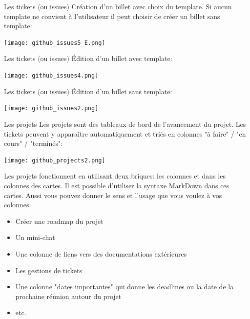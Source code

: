 \documentclass{beamer}
\begin{document}
\begin{frame}{Les tickets (ou issues)}
Création d'un billet avec choix du template. Si aucun template ne convient à l'utilisateur il peut choisir de créer un billet sans template:
\begin{center}
	\texttt{[image: github\_issues5\_E.png]}
\end{center}
\end{frame}

\begin{frame}{Les tickets (ou issues)}
Édition d'un billet avec template:
\begin{center}
	\texttt{[image: github\_issues4.png]}
\end{center}
\end{frame}

\begin{frame}{Les tickets (ou issues)}
Édition d'un billet sans template:
\begin{center}
	\texttt{[image: github\_issues2.png]}
\end{center}
\end{frame}


\begin{frame}{Les projets}
Les projets sont des tableaux de bord de l'avancement du projet. Les tickets peuvent y apparaître automatiquement et triés en colonnes "à faire" / "en cours" / "terminés":
\begin{center}
	\texttt{[image: github\_projects2.png]}
\end{center}
\end{frame}

\begin{frame}
Les projets fonctionnent en utilisant deux briques: les colonnes et dans les colonnes des cartes. Il est possible d'utiliser la syntaxe MarkDown dans ces cartes. Aussi vous pouvez donner le sens et l'usage que vous voulez à vos colonnes:\\
\medskip

\begin{itemize}
	\item Créer une roadmap du projet
	\item Un mini-chat
	\item Une colonne de liens vers des documentations extérieures
	\item Les gestions de tickets
	\item Une colonne "dates importantes" qui donne les deadlines ou la date de la prochaine réunion autour du projet
	\item etc.
\end{itemize}
\end{frame}
\end{document}
